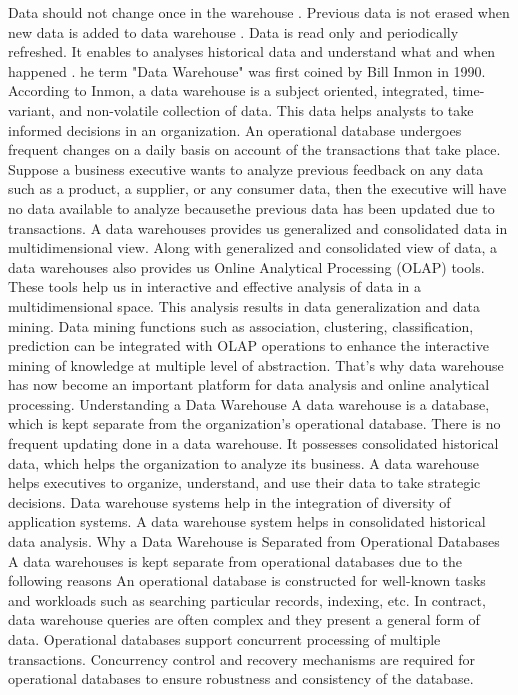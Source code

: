 \documentclass{article}
\begin{document}
 Data should not change once in the warehouse .
 Previous data is not erased when new data is added to data warehouse .
Data is read only and periodically refreshed.
It enables to analyses historical data and understand what and when happened .
he term "Data Warehouse" was first coined by Bill Inmon in 1990. According to Inmon, a data warehouse is a subject oriented, integrated, time-variant, and non-volatile collection of data. This data helps analysts to take informed decisions in an organization.
An operational database undergoes frequent changes on a daily basis on account of the transactions that take place. Suppose a business executive wants to analyze previous feedback on any data such as a product, a supplier, or any consumer data, then the executive will have no data available to analyze becausethe previous data has been updated due to transactions.
A data warehouses provides us generalized and consolidated data in multidimensional view. Along with generalized and consolidated view of data, a data warehouses also provides us Online Analytical Processing (OLAP) tools. These tools help us in interactive and effective analysis of data in a multidimensional space. This analysis results in data generalization and data mining.
Data mining functions such as association, clustering, classification, prediction can be integrated with OLAP operations to enhance the interactive mining of knowledge at multiple level of abstraction. That's why data warehouse has now become an important platform for data analysis and online analytical processing.
Understanding a Data Warehouse
A data warehouse is a database, which is kept separate from the organization's operational database.
There is no frequent updating done in a data warehouse.
It possesses consolidated historical data, which helps the organization to analyze its business.
A data warehouse helps executives to organize, understand, and use their data to take strategic decisions.
Data warehouse systems help in the integration of diversity of application systems.
A data warehouse system helps in consolidated historical data analysis.
Why a Data Warehouse is Separated from Operational Databases
A data warehouses is kept separate from operational databases due to the following reasons 
An operational database is constructed for well-known tasks and workloads such as searching particular records, indexing, etc. In contract, data warehouse queries are often complex and they present a general form of data.
Operational databases support concurrent processing of multiple transactions. Concurrency control and recovery mechanisms are required for operational databases to ensure robustness and consistency of the database.
\end{document}
